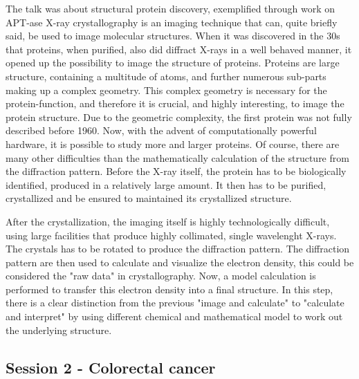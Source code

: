 \documentclass[12p]{article}
\begin{document}
The talk was about structural protein discovery, exemplified through work on APT-ase
X-ray crystallography is an imaging technique that can, quite briefly said, be used to image molecular structures.
When it was discovered in the 30s that proteins, when purified, also did diffract X-rays in a well behaved manner, it opened up the possibility to image the structure of proteins.
Proteins are large structure, containing a multitude of atoms, and further numerous sub-parts making up a complex geometry.
This complex geometry is necessary for the protein-function, and therefore it is crucial, and highly interesting, to image the protein structure.
Due to the geometric complexity, the first protein was not fully described before 1960.
Now, with the advent of computationally  powerful hardware, it is possible to study more and larger proteins.
Of course, there are many other difficulties than the mathematically calculation of the structure from the diffraction pattern.
Before the X-ray itself, the protein has to be biologically identified, produced in a relatively large amount.
It then has to be purified, crystallized and be ensured to maintained its crystallized structure.

After the crystallization, the imaging itself is highly technologically difficult, using large facilities that produce highly collimated, single wavelenght X-rays.
The crystals has to be rotated to produce the diffraction pattern.
The diffraction pattern are then used to calculate and visualize the electron density, this could be considered the "raw data" in crystallography.
Now, a model calculation is performed to transfer this electron density into a final structure.
In this step, there is a clear distinction from the previous "image and calculate" to "calculate and interpret" by using different chemical and mathematical model to work out the underlying structure.


\subsection*{Session 2 - Colorectal cancer}
\end{document}

